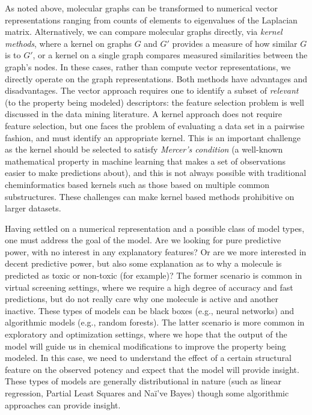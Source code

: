 \documentclass{../sig-alternate}
\begin{document}
As noted above, molecular graphs can be transformed to numerical
vector representations ranging from counts of elements to eigenvalues
of the Laplacian matrix.  Alternatively, we can compare molecular
graphs directly, via \emph{kernel methods}, where a kernel on graphs
$G$ and $G'$ provides a measure of how similar $G$ is to $G'$, or a
kernel on a single graph compares measured similarities between the
graph's nodes. In these cases, rather than compute vector
representations, we directly operate on the graph representations.
Both methods have advantages and disadvantages. The vector approach
requires one to identify a subset of \emph{relevant} (to the property
being modeled) descriptors: the feature selection problem is
well discussed in the data mining literature. A kernel approach
does not require feature selection, but one faces the problem of
evaluating a data set in a pairwise fashion, and must
identify an appropriate kernel. This is an important challenge as the
kernel should be selected to satisfy \emph{Mercer's condition} (a
well-known mathematical property in machine learning that makes a set
of observations easier to make predictions about), and this is not
always possible with traditional cheminformatics based kernels such as those based on multiple common substructures. 
These challenges can
make kernel based methods prohibitive on larger datasets.

Having settled on a numerical representation and a possible class of
model types, one must address the goal of the model. Are we looking
for pure predictive power, with no interest in any explanatory
features? Or are we more interested in decent predictive power, but
also some explanation as to why a molecule is predicted as toxic or
non-toxic (for example)? The former scenario is common in virtual
screening settings, where we require a high degree of accuracy and
fast predictions, but do not really care why one molecule is active
and another inactive. These types of models can be black boxes (e.g.,
neural networks) and algorithmic models \cite{Breiman:2001fk} (e.g., random
forests). The latter scenario is more common in exploratory and
optimization settings, where we hope that the output of the model will
guide us in chemical modifications to improve the property being
modeled.  In this case, we need to understand the effect of a certain
structural feature on the observed potency and expect that the model
will provide insight. These types of models are generally
distributional in nature (such as linear regression, Partial Least
Squares and Na\"{i'}ve Bayes) though some algorithmic approaches
 can provide insight.
\end{document}
